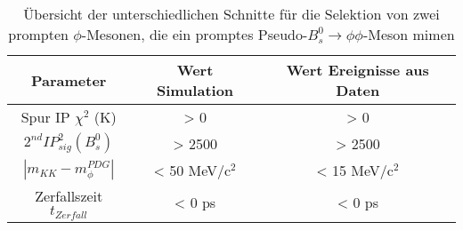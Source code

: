 \documentclass{article}
\begin{document}
\begin{table}[h!]
\noindent \begin{centering}
\begin{tabular}{c|c|c} 
Parameter & Wert Simulation & Wert Ereignisse aus Daten\tabularnewline
\hline 

Spur IP $\chi^2$ (K)  & > 0 & > 0 \tabularnewline
$ 2^{nd} IP^2_{sig}(B_s^0) $ & > 2500& > 2500 \tabularnewline 
$|m_{KK}-m^{PDG}_{\phi}| $ & < 50 MeV/c$^2$& < 15 MeV/c$^2$ \tabularnewline
Zerfallszeit $t_{Zerfall}$ & < 0 ps& < 0 ps \tabularnewline 
\end{tabular}
\par\end{centering}
\caption{Übersicht der unterschiedlichen Schnitte für die Selektion von zwei prompten $\phi$-Mesonen, die ein promptes Pseudo-$B_s^0\rightarrow\phi\phi$-Meson mimen}%
\label{table:prompteschnitte}
\end{table}

%
\end{document}
